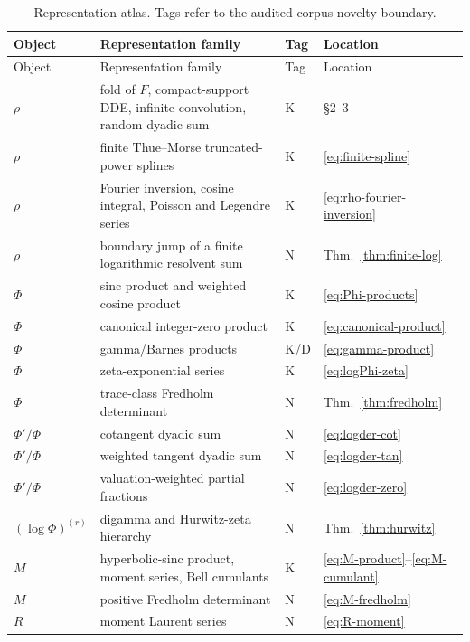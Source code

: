 \documentclass[11pt]{article}
\theoremstyle{definition}
\theoremstyle{remark}
\newcommand{\statusknown}{\textsf{K}}
\newcommand{\statusderived}{\textsf{D}}
\newcommand{\statusnew}{\textsf{N}}
\begin{document}
\small
\begin{longtable}{@{}p{}p{}p{}p{}@{}}
\caption{Representation atlas.  Tags refer to the audited-corpus novelty boundary.}
\label{tab:atlas}\\
\toprule
Object & Representation family & Tag & Location \\
\midrule
\endfirsthead
\toprule
Object & Representation family & Tag & Location \\
\midrule
\endhead
\(\rho\) & fold of \(F\), compact-support DDE, infinite convolution, random dyadic sum & \statusknown & \S2--3 \\
\(\rho\) & finite Thue--Morse truncated-power splines & \statusknown & \eqref{eq:finite-spline} \\
\(\rho\) & Fourier inversion, cosine integral, Poisson and Legendre series & \statusknown & \eqref{eq:rho-fourier-inversion} \\
\(\rho\) & boundary jump of a finite logarithmic resolvent sum & \statusnew & Thm.~\ref{thm:finite-log} \\
\(\Phi\) & sinc product and weighted cosine product & \statusknown & \eqref{eq:Phi-products} \\
\(\Phi\) & canonical integer-zero product & \statusknown & \eqref{eq:canonical-product} \\
\(\Phi\) & gamma/Barnes products & \statusknown/\statusderived & \eqref{eq:gamma-product} \\
\(\Phi\) & zeta-exponential series & \statusknown & \eqref{eq:logPhi-zeta} \\
\(\Phi\) & trace-class Fredholm determinant & \statusnew & Thm.~\ref{thm:fredholm} \\
\(\Phi'/\Phi\) & cotangent dyadic sum & \statusnew & \eqref{eq:logder-cot} \\
\(\Phi'/\Phi\) & weighted tangent dyadic sum & \statusnew & \eqref{eq:logder-tan} \\
\(\Phi'/\Phi\) & valuation-weighted partial fractions & \statusnew & \eqref{eq:logder-zero} \\
\((\log\Phi)^{(r)}\) & digamma and Hurwitz-zeta hierarchy & \statusnew & Thm.~\ref{thm:hurwitz} \\
\(M\) & hyperbolic-sinc product, moment series, Bell cumulants & \statusknown & \eqref{eq:M-product}--\eqref{eq:M-cumulant} \\
\(M\) & positive Fredholm determinant & \statusnew & \eqref{eq:M-fredholm} \\
\(R\) & moment Laurent series & \statusnew & \eqref{eq:R-moment} \\

\end{longtable}
\end{document}
